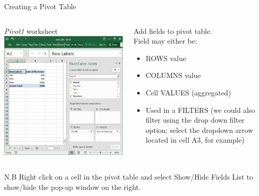 \documentclass[xcolor=svgnames]{beamer}
\begin{document}
\begin{frame}{Creating a Pivot Table}
\begin{columns}[T] %
\begin{column}{.48\textwidth}
\textit{Pivot1} worksheet
{\includegraphics[width=1.2\textwidth]{pivot3}}
\end{column}%
\hfill%
\begin{column}{.48\textwidth}
\vspace{1em}
Add fields to pivot table.\\[1em]
Field may either be:
\begin{itemize}
\item ROWS value
\item  COLUMNS value
\item  Cell VALUES (aggregated)
\item  Used in a FILTERS (we could also filter using the drop down filter option; select the dropdown arrow located in cell A3, for example)
\end{itemize}
\end{column}%
\end{columns}
N.B Right click on a cell in the pivot table and select Show/Hide Fields List to show/hide the pop-up window on the right.
\end{frame}
\end{document}
